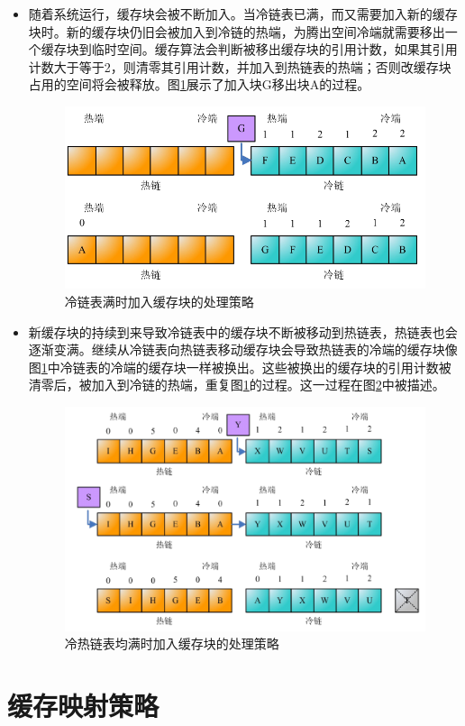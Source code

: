 \begin{enumerate}
\begin{itemize}
\item
随着系统运行，缓存块会被不断加入。当冷链表已满，而又需要加入新的缓存块时。新的缓存块仍旧会被加入到冷链的热端，为腾出空间冷端就需要移出一个缓存块到临时空间。缓存算法会判断被移出缓存块的引用计数，如果其引用计数大于等于2，则清零其引用计数，并加入到热链表的热端；否则改缓存块占用的空间将会被释放。图\ref{fig:replace-algo-3}展示了加入块G移出块A的过程。
\begin{figure}[H]
\centering
\includegraphics[width=0.6\linewidth]{./graph/replace-algo-3}
\caption{冷链表满时加入缓存块的处理策略}
\label{fig:replace-algo-3}
\end{figure}

\item
新缓存块的持续到来导致冷链表中的缓存块不断被移动到热链表，热链表也会逐渐变满。继续从冷链表向热链表移动缓存块会导致热链表的冷端的缓存块像图\ref{fig:replace-algo-3}中冷链表的冷端的缓存块一样被换出。这些被换出的缓存块的引用计数被清零后，被加入到冷链的热端，重复图\ref{fig:replace-algo-3}的过程。这一过程在图\ref{fig:replace-algo-4}中被描述。
\begin{figure}[H]
\centering
\includegraphics[width=0.7\linewidth]{./graph/replace-algo-4}
\caption{冷热链表均满时加入缓存块的处理策略}
\label{fig:replace-algo-4}
\end{figure}
\end{itemize}

\end{enumerate}

\section{缓存映射策略}
\label{sec:cache_mapping}

